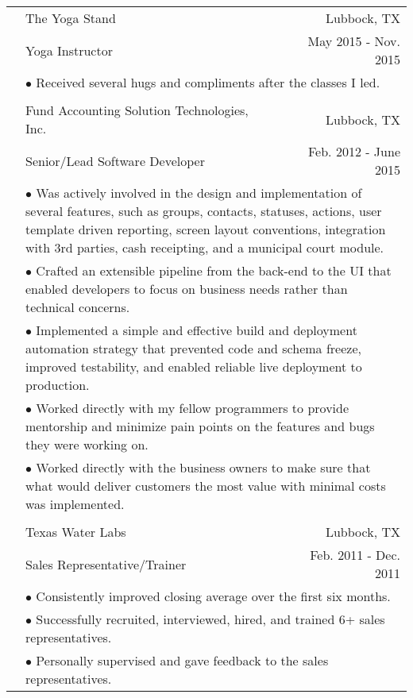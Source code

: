 \documentclass[11pt,oneside,letterpaper,titlepage,fleqn]{article}
\begin{document}
\begin{tabular}[h]{@{}p{3.25cm}@{}lr}
& The Yoga Stand & Lubbock, TX\\
           & Yoga Instructor & May 2015 - Nov. 2015\\
           & \multicolumn{2}{p{14cm}}{$\bullet$ Received several hugs and compliments after the classes I led.}\\
\\          				
& Fund Accounting Solution Technologies, Inc. & Lubbock, TX\\
           & Senior/Lead Software Developer & Feb. 2012 - June 2015\\
           & \multicolumn{2}{p{14cm}}{$\bullet$ Was actively involved in the design and implementation of several features, such as groups,
 contacts, statuses, actions, user template driven reporting, screen layout conventions,
integration with 3rd parties, cash receipting, and a municipal court module.}\\
           & \multicolumn{2}{p{14cm}}{$\bullet$ Crafted an extensible pipeline from the back-end to the UI that enabled developers to
 focus on business needs rather than technical concerns.}\\
           & \multicolumn{2}{p{14cm}}{$\bullet$ Implemented a simple and effective build and deployment automation strategy that prevented
 code and schema freeze, improved testability, and enabled reliable live deployment to production.}\\
           & \multicolumn{2}{p{14cm}}{$\bullet$ Worked directly with my fellow programmers to provide mentorship and minimize pain points
 on the features and bugs they were working on.}\\			
           & \multicolumn{2}{p{14cm}}{$\bullet$ Worked directly with the business owners to make sure that what would deliver customers the
 most value with minimal costs was implemented.}\\
\\
						& Texas Water Labs & Lubbock, TX\\
						& Sales Representative/Trainer	 &  Feb. 2011 - Dec. 2011\\
           & \multicolumn{2}{p{14cm}}{$\bullet$ Consistently improved closing average over the first six months.}\\
           & \multicolumn{2}{p{14cm}}{$\bullet$ Successfully recruited, interviewed, hired, and trained 6+ sales representatives.}\\
           & \multicolumn{2}{p{14cm}}{$\bullet$ Personally supervised and gave feedback to the sales representatives.}\\
\end{tabular}	
\end{document}
